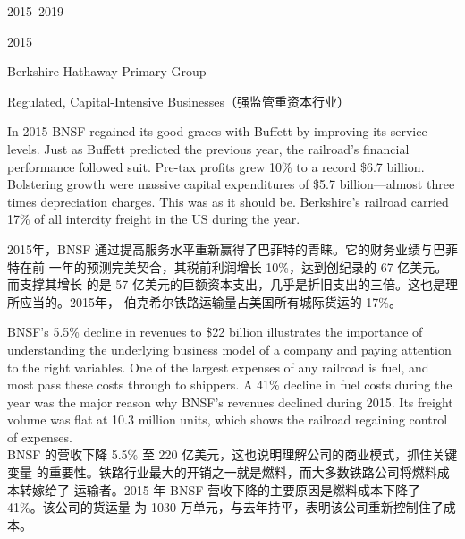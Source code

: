 \begin{chapter}{2015--2019}
\begin{section}{2015}
\begin{subsection}{Berkshire Hathaway Primary Group}
\end{subsection}

\begin{subsection}{Regulated, Capital-Intensive Businesses（强监管重资本行业）}
\begin{verseparallel}
  {

    In 2015 BNSF regained its good graces with Buffett by improving its service
    levels. Just as Buffett predicted the previous year, the railroad's
    financial performance followed suit. Pre-tax profits grew 10\% to a record
    \$6.7 billion. Bolstering growth were massive capital expenditures of \$5.7
    billion—almost three times depreciation charges. This was as it
    should be. Berkshire's railroad carried 17\% of all intercity freight in the
    US during the year. \\

  }
  {
    2015年，BNSF 通过提高服务水平重新赢得了巴菲特的青睐。它的财务业绩与巴菲特在前
    一年的预测完美契合，其税前利润增长 10\%，达到创纪录的 67 亿美元。而支撑其增长
    的是 57 亿美元的巨额资本支出，几乎是折旧支出的三倍。这也是理所应当的。2015年，
    伯克希尔铁路运输量占美国所有城际货运的 17\%。
  }
\end{verseparallel}

\begin{verseparallel}
  {
    BNSF's 5.5\% decline in revenues to \$22 billion illustrates the importance
    of understanding the underlying business model of a company and paying
    attention to the right variables. One of the largest expenses of any
    railroad is fuel, and most pass these costs through to shippers. A 41\%
    decline in fuel costs during the year was the major reason why BNSF's
    revenues declined during 2015. Its freight volume was flat at 10.3 million
    units, which shows the railroad regaining control of expenses. \\
  }
  {
    BNSF 的营收下降 5.5\% 至 220 亿美元，这也说明理解公司的商业模式，抓住关键变量
    的重要性。铁路行业最大的开销之一就是燃料，而大多数铁路公司将燃料成本转嫁给了
    运输者。2015 年 BNSF 营收下降的主要原因是燃料成本下降了 41\%。该公司的货运量
    为 1030 万单元，与去年持平，表明该公司重新控制住了成本。
  }
\end{verseparallel}


\end{subsection}
\end{section}
\end{chapter}
